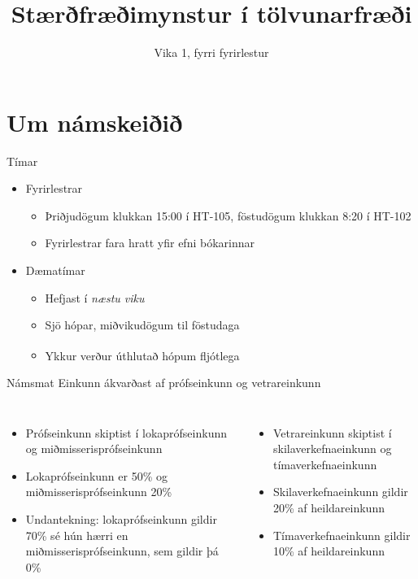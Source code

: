 \documentclass{beamer}
\title{Stærðfræðimynstur í tölvunarfræði}
\subtitle{Vika 1, fyrri fyrirlestur}
\begin{document}
\begin{frame}
\titlepage
\end{frame}

\section{Um námskeiðið}

\begin{frame}{Tímar}
\begin{itemize}
 \item Fyrirlestrar
 \begin{itemize}
  \item Þriðjudögum klukkan 15:00 í HT-105, föstudögum klukkan 8:20 í HT-102
  \item Fyrirlestrar fara hratt yfir efni bókarinnar
 \end{itemize}
 \item Dæmatímar
 \begin{itemize}
  \item Hefjast í \emph{næstu viku}
  \item Sjö hópar, miðvikudögum til föstudaga
  \item Ykkur verður úthlutað hópum fljótlega\textsuperscript{\textregistered}
 \end{itemize}
\end{itemize} 
\end{frame}

\begin{frame}{Námsmat}
Einkunn ákvarðast af prófseinkunn og vetrareinkunn
\begin{columns}
\begin{itemize}
 \item Prófseinkunn skiptist í lokaprófseinkunn og miðmisserisprófseinkunn
 \item Lokaprófseinkunn er 50\% og miðmisserisprófseinkunn 20\%
 \item Undantekning: lokaprófseinkunn gildir 70\% sé hún hærri en miðmisserisprófseinkunn, sem gildir þá 0\%
\end{itemize}
\begin{itemize}
 \item Vetrareinkunn skiptist í skilaverkefnaeinkunn og tímaverkefnaeinkunn
 \item Skilaverkefnaeinkunn gildir 20\% af heildareinkunn
 \item Tímaverkefnaeinkunn gildir 10\% af heildareinkunn
\end{itemize}
\end{columns}
\end{frame}
\end{document}
